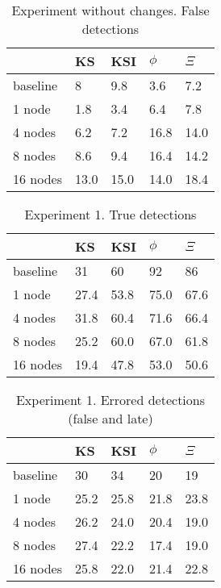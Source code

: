 \label {fs-lightbulbs-experiments}

    
\begin{table}[h]
    \centering
    \begin{tabular}{|l||l|l|l|l|}
        \hline
         & KS & KSI & $\phi$ & $\Xi$ \\ \hline
        baseline & 8 & 9.8 & 3.6 & 7.2 \\ \hline
        1 node & 1.8 & 3.4 & 6.4 & 7.8 \\ \hline
        4 nodes & 6.2 & 7.2 & 16.8 & 14.0 \\ \hline
        8 nodes & 8.6 & 9.4 & 16.4 & 14.2 \\ \hline
        16 nodes & 13.0 & 15.0 & 14.0 & 18.4 \\ \hline
    \end{tabular}
    \caption{Experiment without changes. False detections}
\end{table}

\begin{table}[h]
    \centering
    \begin{tabular}{|l||l|l|l|l|}
        \hline
         & KS & KSI & $\phi$ & $\Xi$ \\ \hline
        baseline & 31 & 60 & 92 & 86 \\ \hline
        1 node & 27.4 & 53.8 & 75.0 & 67.6 \\ \hline
        4 nodes & 31.8 & 60.4 & 71.6 & 66.4 \\ \hline
        8 nodes & 25.2 & 60.0 & 67.0 & 61.8 \\ \hline
        16 nodes & 19.4 & 47.8 & 53.0 & 50.6 \\ \hline
    \end{tabular}
    \caption{Experiment 1. True detections}
\end{table}



\begin{table}[h]
    \centering
    \begin{tabular}{|l||l|l|l|l|}
        \hline
         & KS & KSI & $\phi$ & $\Xi$ \\ \hline
        baseline & 30 & 34 & 20 & 19 \\ \hline
        1 node & 25.2 & 25.8 & 21.8 & 23.8 \\ \hline
        4 nodes & 26.2 & 24.0 & 20.4 & 19.0 \\ \hline
        8 nodes & 27.4 & 22.2 & 17.4 & 19.0 \\ \hline
        16 nodes & 25.8 & 22.0 & 21.4 & 22.8 \\ \hline
    \end{tabular}
    \caption{Experiment 1. Errored detections (false and late)}
\end{table}

